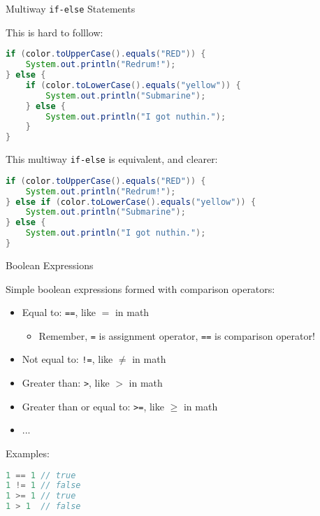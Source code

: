 \documentclass{beamer}
\begin{document}
\begin{frame}[fragile]{Multiway {\tt if-else} Statements}


This is hard to folllow:
\begin{lstlisting}[language=Java]
if (color.toUpperCase().equals("RED")) {
    System.out.println("Redrum!");
} else {
    if (color.toLowerCase().equals("yellow")) {
        System.out.println("Submarine");
    } else {
        System.out.println("I got nuthin.");
    }
}
\end{lstlisting}
\vspace{-.1in}
This multiway {\tt if-else} is equivalent, and clearer:
\vspace{-.1in}
\begin{lstlisting}[language=Java]
if (color.toUpperCase().equals("RED")) {
    System.out.println("Redrum!");
} else if (color.toLowerCase().equals("yellow")) {
    System.out.println("Submarine");
} else {
    System.out.println("I got nuthin.");
}
\end{lstlisting}

\end{frame}

\begin{frame}[fragile]{Boolean Expressions}


Simple boolean expressions formed with comparison operators:
\begin{itemize}
\item Equal to: {\tt ==}, like $=$ in math
  \begin{itemize}
    \item Remember, {\tt =} is assignment operator, {\tt ==} is comparison operator!
  \end{itemize}
\item Not equal to: {\tt !=}, like $\ne$ in math
\item Greater than: {\tt >}, like $>$ in math
\item Greater than or equal to: {\tt >=}, like $\ge$ in math
\item ...
\end{itemize}
Examples:
\begin{lstlisting}[language=Java]
1 == 1 // true
1 != 1 // false
1 >= 1 // true
1 > 1  // false
\end{lstlisting}

\end{frame}
\end{document}
